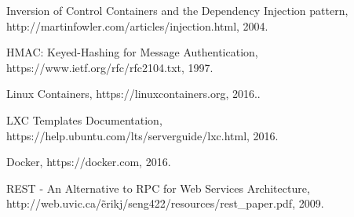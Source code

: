 \documentclass[conference, spanish]{IEEEtran}
\begin{document}
\begin{thebibliography}{1}
 Inversion of Control Containers and the Dependency Injection pattern, http://martinfowler.com/articles/injection.html, 2004.

HMAC: Keyed-Hashing for Message Authentication, https://www.ietf.org/rfc/rfc2104.txt, 1997.

Linux Containers, https://linuxcontainers.org, 2016..

LXC Templates Documentation, https://help.ubuntu.com/lts/serverguide/lxc.html, 2016.

Docker, https://docker.com, 2016.

 REST - An Alternative to RPC for Web Services Architecture, http://web.uvic.ca/\~erikj/seng422/resources/rest\_paper.pdf, 2009.



\end{thebibliography}




\end{document}
